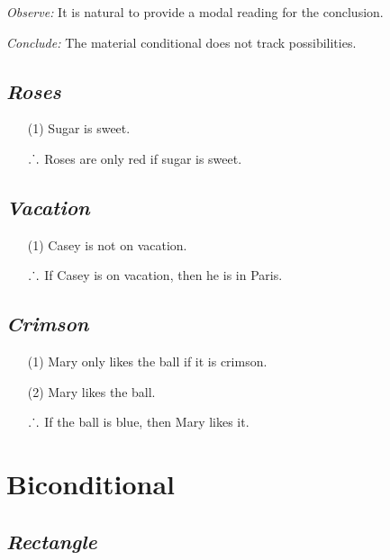 \documentclass[a4paper, 11pt]{article} %
\def\therefore{\ensuremath{\ldotp\dot{}\,\ldotp}}
\begin{document}
\noindent
\textit{Observe:} It is natural to provide a modal reading for the conclusion.
\vspace{.05in}

\noindent
\textit{Conclude:} The material conditional does not track possibilities.




\subsection*{\it \textbf{Roses}}

\begin{enumerate}
  \item[(1)] Sugar is sweet.
  \item[\therefore] Roses are only red if sugar is sweet.
\end{enumerate}




\subsection*{\it \textbf{Vacation}}

\begin{enumerate}
  \item[(1)] Casey is not on vacation.
  \item[\therefore] If Casey is on vacation, then he is in Paris.
\end{enumerate}





\subsection*{\it \textbf{Crimson}}

\begin{enumerate}
  \item[(1)] Mary only likes the ball if it is crimson.
  \item[(2)] Mary likes the ball.
  \item[\therefore] If the ball is blue, then Mary likes it.
\end{enumerate}






\section*{Biconditional}

\subsection*{\it \textbf{Rectangle}}
\end{document}
